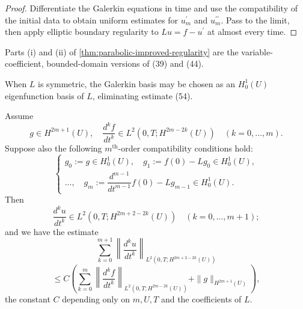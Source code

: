 \begin{proof}
\sketch Differentiate the Galerkin equations in time and use the compatibility of the initial data to obtain uniform estimates for $u_m^{\prime}$ and $u_m^{\prime\prime}$. Pass to the limit, then apply elliptic boundary regularity to $Lu=f-u^{\prime}$ at almost every time.
\end{proof}

\begin{remark}
\label{rem:parabolic-improved-regularity-remark}
Parts (i) and (ii) of \cref{thm:parabolic-improved-regularity} are the variable-coefficient, bounded-domain versions of (39) and (44).
\end{remark}

\begin{remark}
\label{rem:parabolic-regularity-symmetric-eigenfunctions}
When $L$ is symmetric, the Galerkin basis may be chosen as an $H_0^1(U)$ eigenfunction basis of $L$, eliminating estimate (54).
\end{remark}

\begin{theorem}
\label{thm:parabolic-higher-regularity}
Assume
\[
g \in H^{2m+1}(U), \quad \frac{d^k f}{dt^k} \in L^2(0,T; H^{2m-2k}(U)) \quad (k=0,\ldots,m).
\]
Suppose also the following $m^{\text{th}}$-order compatibility conditions hold:
\[
\begin{cases}
g_0 := g \in H^1_0(U), \quad g_1 := f(0) - Lg_0 \in H^1_0(U), \\
\ldots, \quad g_m := \dfrac{d^{m-1}}{dt^{m-1}}f(0) - Lg_{m-1} \in H^1_0(U).
\end{cases}
\]
Then
\[
\frac{d^k u}{dt^k} \in L^2(0,T; H^{2m+2-2k}(U)) \quad (k=0,\ldots,m+1);
\]
and we have the estimate
\[
\sum_{k=0}^{m+1} \left\| \frac{d^k u}{dt^k} \right\|_{L^2(0,T;H^{2m+2-2k}(U))}
\]
\[
\leq C \left( \sum_{k=0}^{m} \left\| \frac{d^k f}{dt^k} \right\|_{L^2(0,T;H^{2m-2k}(U))} + \|g\|_{H^{2m+1}(U)} \right),
\tag{55}
\]
the constant $C$ depending only on $m, U, T$ and the coefficients of $L$.
\end{theorem}

